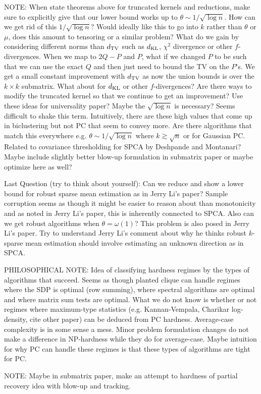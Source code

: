 \documentclass[11pt]{article}
\begin{document}
NOTE: When state theorems above for truncated kernels and reductions, make sure to explicitly give that our lower bound works up to $\theta \sim 1/\sqrt{\log n}$. How can we get rid of this $1/\sqrt{\log n}$? Would ideally like this to go into $k$ rather than $\theta$ or $\mu$, does this amount to tensoring or a similar problem? What do we gain by considering different norms than $d_{\text{TV}}$ such as $d_{\text{KL}}$, $\chi^2$ divergence or other $f$-divergences. When we map to $2Q - P$ and $P$, what if we changed $P$ to be such that we can use the exact $Q$ and then just need to bound the TV on the $P$'s. We get a small constant improvement with $d_{\text{TV}}$ as now the union bounds is over the $k \times k$ submatrix. What about for $d_{\text{KL}}$ or other $f$-divergences? Are there ways to modify the truncated kernel so that we continue to get an improvement? Use these ideas for universality paper? Maybe the $\sqrt{\log n}$ is necessary? Seems difficult to shake this term. Intuitively, there are these high values that come up in biclustering but not PC that seem to convey more. Are there algorithms that match this everywhere e.g. $\theta \sim 1/\sqrt{\log n}$ where $k \gtrsim \sqrt{n}$ or for Gaussian PC. Related to covariance thresholding for SPCA by Deshpande and Montanari? Maybe include slightly better blow-up formulation in submatrix paper or maybe optimize here as well?

Last Question (try to think about yourself): Can we reduce and show a lower bound for robust sparse mean estimation as in Jerry Li's paper? Sample corruption seems as though it might be easier to reason about than monotonicity and as noted in Jerry Li's paper, this is inherently connected to SPCA. Also can we get robust algorithms when $\theta = \omega(1)$? This problem is also posed in Jerry Li's paper. Try to understand Jerry Li's comment about why he thinks robust $k$-sparse mean estimation should involve estimating an unknown direction as in SPCA.

PHILOSOPHICAL NOTE: Idea of classifying hardness regimes by the types of algorithms that succeed. Seems as though planted clique can handle regimes where the SDP is optimal (row summing), where spectral algorithms are optimal and where matrix sum tests are optimal. What we do not know is whether or not regimes where maximum-type statistics (e.g. Kannan-Vempala, Charikar log-density, cite other paper) can be deduced from PC hardness. Average-case complexity is in some sense a mess. Minor problem formulation changes do not make a difference in NP-hardness while they do for average-case. Maybe intuition for why PC can handle these regimes is that these types of algorithms are tight for PC.

NOTE: Maybe in submatrix paper, make an attempt to hardness of partial recovery idea with blow-up and tracking.



\end{document}
